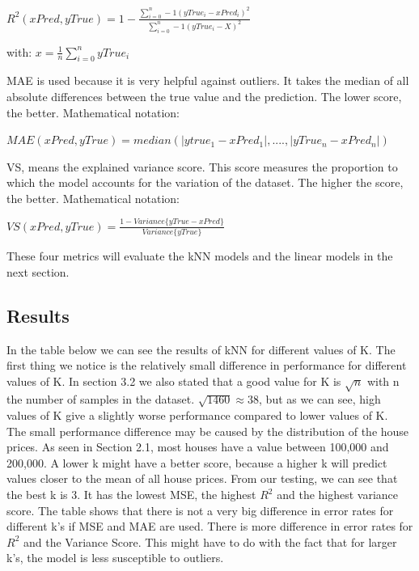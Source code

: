 \documentclass[a4paper,11pt]{article}
\begin{document}
\begin{center}
$R^2(xPred,yTrue) = 1- \frac{\sum\limits_{i=0}^n-1 (yTrue_i-xPred_i)^2}{\sum\limits_{i=0}^n-1 (yTrue_i-X)^2}$

with: $x = \frac{1}{n}  \sum\limits_{i=0}^n yTrue_i$
\end{center}

MAE is used because it is very helpful against outliers. It takes the median of all absolute differences between the true value and the prediction. The lower score, the better. Mathematical notation:


\begin{center}
$MAE(xPred,yTrue)=median(|ytrue_1-xPred_1|,....,|yTrue_n-xPred_n|)$
\end{center}

VS, means the explained variance score. This score measures the proportion to which the model accounts for the variation of the dataset. The higher the score, the better. Mathematical notation:
\\

\begin{center}
$VS(xPred,yTrue)=\frac{1-Variance\{yTrue-xPred\}}{Variance\{yTrue\}}$
\end{center}

These four metrics will evaluate the kNN models and the linear models in the next section.


\subsection{Results}
In the table below we can see the results of kNN for different values of K. The first thing we notice is the relatively small difference in performance for different values of K. In section 3.2 we also stated that a good value for K is $\sqrt{n}$ with n the number of samples in the dataset. $\sqrt{1460}\approx38$, but as we can see, high values of K give a slightly worse performance compared to lower values of K. \\
The small performance difference may be caused by the distribution of the house prices. As seen in Section 2.1, most houses have a value between 100,000 and 200,000. A lower k might have a better score, because a higher k will predict values closer to the mean of all house prices. From our testing, we can see that the best k is 3. It has the lowest MSE, the highest $R^2$ and the highest variance score. 
The table shows that there is not a very big difference in error rates for different k’s if MSE and MAE are used. There is more difference in error rates for $R^2$ and the Variance Score. This might have to do with the fact that for larger k’s, the model is less susceptible to outliers. 
\end{document}

